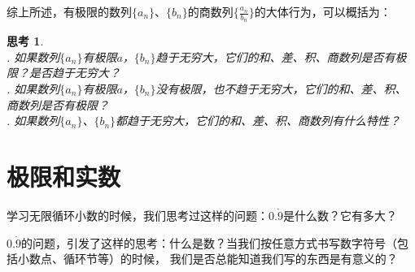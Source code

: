 \documentclass[12pt,UTF8]{ctexbook}
\newtheorem{sk}{思考}[section]
\begin{document}
综上所述，有极限的数列$\{a_n\}$、$\{b_n\}$的商数列$\{\frac{a_n}{b_n}\}$的大体行为，可以概括为：
\begin{center}
\end{center}

\begin{sk}
    \mbox{} \\
    . 如果数列$\{a_n\}$有极限$a$，$\{b_n\}$趋于无穷大，它们的和、差、积、商数列是否有极限？是否趋于无穷大？\\
    . 如果数列$\{a_n\}$有极限$a$，$\{b_n\}$没有极限，也不趋于无穷大，它们的和、差、积、商数列是否有极限？\\
    . 如果数列$\{a_n\}$、$\{b_n\}$都趋于无穷大，它们的和、差、积、商数列有什么特性？
\end{sk}

\section{极限和实数}
\begin{center}
\end{center}

学习无限循环小数的时候，我们思考过这样的问题：$0.\dot{9}$是什么数？它有多大？

$0.\dot{9}$的问题，引发了这样的思考：什么是数？当我们按任意方式书写数字符号（包括小数点、循环节等）的时候，
我们是否总能知道我们写的东西是有意义的？
\end{document}
